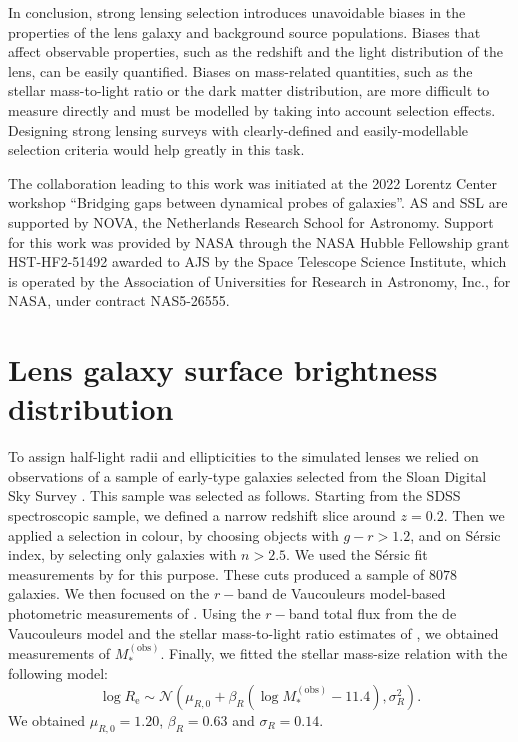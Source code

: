 \documentclass{aa}
\def\reff{R_{\mathrm{e}}}
\def\mobs{M_*^{(\mathrm{obs})}}
\begin{document}
In conclusion, strong lensing selection introduces unavoidable biases in the properties of the lens galaxy and background source populations.
Biases that affect observable properties, such as the redshift and the light distribution of the lens, can be easily quantified.
Biases on mass-related quantities, such as the stellar mass-to-light ratio or the dark matter distribution, are more difficult to measure directly and must be modelled by taking into account selection effects. 
Designing strong lensing surveys with clearly-defined and easily-modellable selection criteria would help greatly in this task.

\begin{acknowledgements}

The collaboration leading to this work was initiated at the 2022 Lorentz Center workshop “Bridging gaps between dynamical probes of galaxies”.
AS and SSL are supported by NOVA, the Netherlands Research School for Astronomy.
Support for this work was provided by NASA through the NASA Hubble Fellowship grant HST-HF2-51492 awarded to AJS by the Space Telescope Science Institute, which is operated by the Association of Universities for Research in Astronomy, Inc., for NASA, under contract NAS5-26555.

\end{acknowledgements}






\appendix
\section{Lens galaxy surface brightness distribution}\label{sect:appendixa}

To assign half-light radii and ellipticities to the simulated lenses we relied on observations of a sample of early-type galaxies selected from the Sloan Digital Sky Survey \citep[SDSS][]{Yor++00}.
This sample was selected as follows. Starting from the SDSS spectroscopic sample, we defined a narrow redshift slice around $z=0.2$. Then we applied a selection in colour, by choosing objects with $g-r>1.2$, and on S\'{e}rsic index, by selecting only galaxies with $n>2.5$. We used the S\'{e}rsic fit measurements by \citet{Mee++15} for this purpose. These cuts produced a sample of $8078$ galaxies.
We then focused on the $r-$band de Vaucouleurs model-based photometric measurements of \citet{Mee++15}.
Using the $r-$band total flux from the de Vaucouleurs model and the stellar mass-to-light ratio estimates of \citet{Men++14}, we obtained measurements of $\mobs$. Finally, we fitted the stellar mass-size relation with the following model:
\begin{equation}
\log{\reff} \sim \mathcal{N}(\mu_{R,0} + \beta_R(\log{\mobs} - 11.4), \sigma_R^2).
\end{equation}
We obtained $\mu_{R,0}=1.20$, $\beta_R=0.63$ and $\sigma_R=0.14$.
\end{document}

